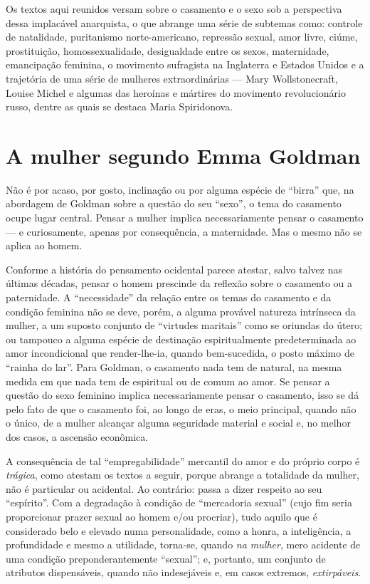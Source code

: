 Os textos aqui reunidos versam sobre o casamento e o sexo
sob a perspectiva dessa implacável anarquista, o que abrange uma série
de subtemas como: controle de natalidade, puritanismo
norte-americano, repressão sexual, amor livre, ciúme,
prostituição, homossexualidade, desigualdade entre os sexos,
maternidade, emancipação feminina, o movimento sufragista na
Inglaterra e Estados Unidos e a trajetória de uma série de mulheres
extraordinárias --- Mary Wollstonecraft, Louise Michel e algumas das
heroínas e mártires do movimento revolucionário russo, dentre as quais
se destaca Maria Spiridonova.

\section{A mulher segundo Emma Goldman }

Não é por acaso, por gosto, inclinação ou por alguma espécie de
``birra'' que, na abordagem de Goldman sobre a questão do seu ``sexo'',
o tema do casamento ocupe lugar central. Pensar a mulher implica
necessariamente pensar o casamento --- e curiosamente, apenas por
consequência, a maternidade.
Mas o mesmo não se aplica ao homem.

Conforme a história do pensamento ocidental parece atestar,
salvo talvez nas últimas décadas, pensar o homem prescinde da
reflexão sobre o casamento ou a paternidade. A ``necessidade'' da
relação entre os temas do casamento e da condição feminina não se deve,
porém, a alguma provável natureza intrínseca da mulher, a um suposto
conjunto de ``virtudes maritais'' como se oriundas do útero; ou tampouco
a alguma espécie de destinação espiritualmente predeterminada ao amor
incondicional que render-lhe-ia, quando bem-sucedida, o posto máximo de
``rainha do lar''. Para Goldman, o casamento nada tem de natural, na
mesma medida em que nada tem de espiritual ou de comum ao amor. Se
pensar a questão do sexo feminino implica necessariamente pensar o
casamento, isso se dá pelo fato de que o casamento foi, ao longo de
eras, o meio principal, quando não o único, de a mulher alcançar alguma
seguridade material e social e, no melhor dos casos, a
ascensão econômica.

A consequência de tal ``empregabilidade'' mercantil do amor e do próprio
corpo é \emph{trágica}, como atestam os textos a seguir, porque abrange
a totalidade da mulher, não é particular ou acidental.
Ao contrário: passa a dizer respeito ao seu
``espírito''. Com a degradação à condição de ``mercadoria sexual'' (cujo
fim seria proporcionar prazer sexual ao homem e/ou procriar),
tudo aquilo que é considerado belo e elevado numa personalidade, como a
honra, a inteligência, a profundidade e mesmo a utilidade, torna-se,
quando \emph{na mulher}, mero acidente de uma condição
preponderantemente ``sexual''; e, portanto, um conjunto de atributos
dispensáveis, quando não indesejáveis e, em casos extremos,
\emph{extirpáveis}.

